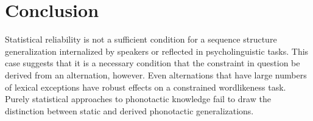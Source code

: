 


\section{Conclusion}

Statistical reliability is not a sufficient condition for a sequence structure generalization internalized by speakers or reflected in psycholinguistic tasks. This case suggests that it is a necessary condition that the constraint in question be derived from an alternation, however. Even alternations that have large numbers of lexical exceptions have robust effects on a constrained wordlikeness task. Purely statistical approaches to phonotactic knowledge fail to draw the distinction between static and derived phonotactic generalizations.

